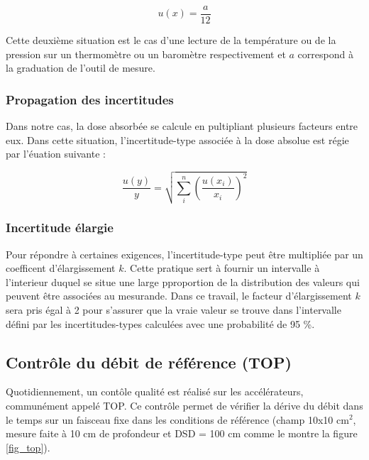 \documentclass{article}
\begin{document}
\begin{equation}
  u(x) = \dfrac{a}{12}
\end{equation}

Cette deuxième situation est le cas d'une lecture de la température ou de la pression sur un thermomètre ou un baromètre respectivement et $a$ correspond à la graduation de l'outil de mesure.

\subsubsection{Propagation des incertitudes}

Dans notre cas, la dose absorbée se calcule en pultipliant plusieurs facteurs entre eux. Dans cette situation, l'incertitude-type associée à la dose absolue est régie par l'éuation suivante :

\begin{equation}
  \dfrac{u(y)}{y} = \sqrt{\sum\limits_i^n \left( \dfrac{u(x_i)}{x_i} \right) ^2}
\end{equation}

\subsubsection{Incertitude élargie}

Pour répondre à certaines exigences, l'incertitude-type peut être multipliée par un coefficent d'élargissement $k$. Cette pratique sert à fournir un intervalle à l'interieur duquel se situe une large pproportion de la distribution des valeurs qui peuvent être associées au mesurande. Dans ce travail, le facteur d'élargissement $k$ sera pris égal à 2 pour s'assurer que la vraie valeur se trouve dans l'intervalle défini par les incertitudes-types calculées avec une probabilité de 95 \%.


\subsection{Contrôle du débit de référence (TOP)}

Quotidiennement, un contôle qualité est réalisé sur les accélérateurs, communément appelé TOP. Ce contrôle permet de vérifier la dérive du débit dans le temps sur un faisceau fixe dans les conditions de référence (champ 10x10 cm$^2$, mesure faite à 10 cm de profondeur et DSD = 100 cm comme le montre la figure \ref*{fig_top}). 
\end{document}
